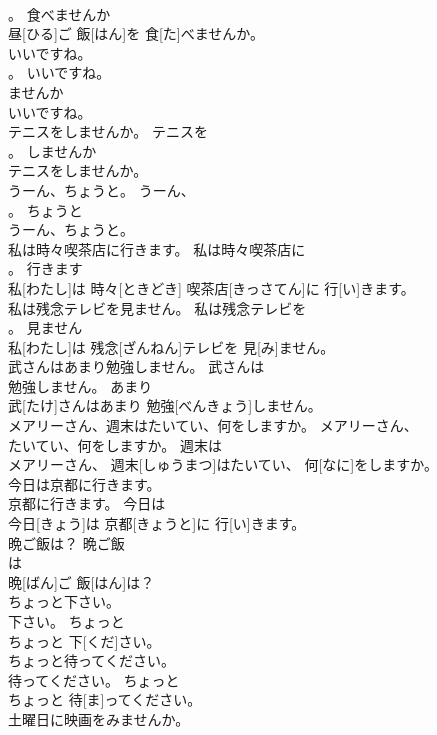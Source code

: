 \documentclass[8pt]{extreport}
\begin{document}
\begin{CJK}{UTF8}{min}
\\	。	食べませんか	
\\	昼[ひる]ご 飯[はん]を 食[た]べませんか。	
\\	いいですね。	
\\	。	いいですね。	
\\	ませんか	
\\	いいですね。	
\\	テニスをしませんか。	テニスを
\\	。	しませんか	
\\	テニスをしませんか。	
\\	うーん、ちょうと。	うーん、
\\	。	ちょうと	
\\	うーん、ちょうと。	
\\	私は時々喫茶店に行きます。	私は時々喫茶店に
\\	。	行きます	
\\	私[わたし]は 時々[ときどき] 喫茶店[きっさてん]に 行[い]きます。	
\\	私は残念テレビを見ません。	私は残念テレビを
\\	。	見ません	
\\	私[わたし]は 残念[ざんねん]テレビを 見[み]ません。	
\\	武さんはあまり勉強しません。	武さんは
\\	勉強しません。	あまり	
\\	武[たけ]さんはあまり 勉強[べんきょう]しません。	
\\	メアリーさん、週末はたいてい、何をしますか。	メアリーさん、
\\	たいてい、何をしますか。	週末は	
\\	メアリーさん、 週末[しゅうまつ]はたいてい、 何[なに]をしますか。	
\\	今日は京都に行きます。	
\\	京都に行きます。	今日は	
\\	今日[きょう]は 京都[きょうと]に 行[い]きます。	
\\	晩ご飯は？	晩ご飯
\\	は	
\\	晩[ばん]ご 飯[はん]は？	
\\	ちょっと下さい。	
\\	下さい。	ちょっと	
\\	ちょっと 下[くだ]さい。	
\\	ちょっと待ってください。	
\\	待ってください。	ちょっと	
\\	ちょっと 待[ま]ってください。	
\\	土曜日に映画をみませんか。 

\end{CJK}
\end{document}
